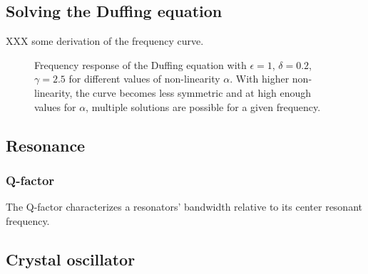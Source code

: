 \subsection{Solving the Duffing equation}
XXX some derivation of the frequency curve. 

\begin{figure}
	\centering
	\setlength\figureheight{5cm} 
	\setlength{}
	
	
	\caption{Frequency response of the Duffing equation with $\epsilon=1$, $\delta=0.2$, $\gamma=2.5$ for different values of non-linearity $\alpha$. With higher non-linearity, the curve becomes less symmetric and at high enough values for $\alpha$, multiple solutions are possible for a given frequency.}
	\label{fig:sphere}
\end{figure}

\subsection{Resonance}



\subsubsection{Q-factor}
The Q-factor characterizes a resonators' bandwidth relative to its center resonant frequency.\cite{electroniccircuits} 

\subsection{Crystal oscillator}
